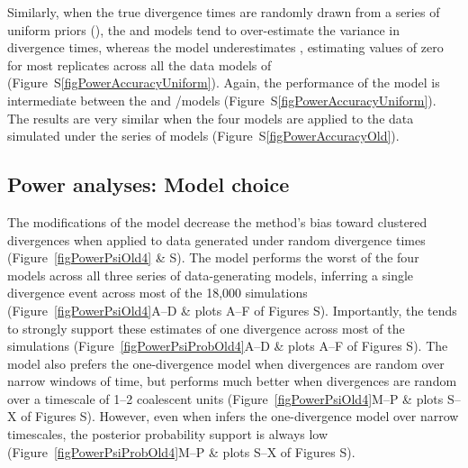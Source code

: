 Similarly, when the true divergence times are randomly drawn from a series of
uniform priors (\powerSeriesUniform), the \modelDPP and \modelUniform models
tend to over-estimate the variance in divergence times, whereas the \modelOld
model underestimates \divTimeDispersion, estimating values of zero for most
replicates across all the data models of \powerSeriesUniform
(Figure~S\ref{figPowerAccuracyUniform}).
Again, the performance of the \modelUshaped model is intermediate between the
\modelOld and \modelDPP/\modelUniform models (Figure~S\ref{figPowerAccuracyUniform}).
The results are very similar when the four models are applied to the data
simulated under the \powerSeriesOld series of models
(Figure~S\ref{figPowerAccuracyOld}).

\subsection{Power analyses: Model choice}
The modifications of the \msb model decrease the method's bias toward clustered
divergences when applied to data generated under random divergence times
(Figure~\ref{figPowerPsiOld4} \& 
S).
The \modelOld model performs the worst of the four models across
all three series of data-generating models, inferring a single divergence event across
most of the 18,000 simulations
(Figure~\ref{figPowerPsiOld4}A--D \& plots A--F of Figures
S).
Importantly, the \modelOld tends to strongly support these estimates
of one divergence across most of the simulations
(Figure~\ref{figPowerPsiProbOld4}A--D \& plots A--F of Figures
S).
The \modelDPP model also prefers the one-divergence model 
when divergences are random over narrow windows of time, but
performs much better when divergences are random over a timescale
of 1--2 coalescent units
(Figure~\ref{figPowerPsiOld4}M--P \& plots S--X of Figures
S).
However, even when \modelDPP infers the one-divergence model over narrow
timescales, the posterior probability support is always low
(Figure~\ref{figPowerPsiProbOld4}M--P \& plots S--X of Figures
S).
